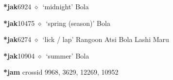   \begin{list}{}{\leftmargin=1.5em \itemindent=-1.5em}
  \item {\footnotesize \textbf{*jak}}{\tiny 6924}
         $\diamond$~`midnight'
         Bola 
  \item {\footnotesize \textbf{*jak}}{\tiny 10475}
\hspace{1ex}
         $\diamond$~`spring (season)'
         Bola 
  \item {\footnotesize \textbf{*jak}}{\tiny 6274}
\hspace{1ex}
         $\diamond$~`lick / lap'
         Rangoon 
\hspace{1ex}
         Atsi 
\hspace{1ex}
         Bola 
\hspace{1ex}
         Lashi 
\hspace{1ex}
         Maru 
  \item {\footnotesize \textbf{*jak}}{\tiny 10904}
\hspace{1ex}
         $\diamond$~`summer'
         Bola 
  \end{list}
\item
\textbf{*jam}
  {\tiny crossid 9968, 3629, 12269, 10952}
